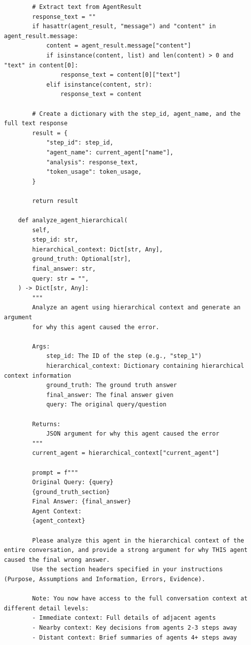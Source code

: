 \documentclass{article}
\begin{document}
\begin{lstlisting}
        # Extract text from AgentResult
        response_text = ""
        if hasattr(agent_result, "message") and "content" in agent_result.message:
            content = agent_result.message["content"]
            if isinstance(content, list) and len(content) > 0 and "text" in content[0]:
                response_text = content[0]["text"]
            elif isinstance(content, str):
                response_text = content

        # Create a dictionary with the step_id, agent_name, and the full text response
        result = {
            "step_id": step_id,
            "agent_name": current_agent["name"],
            "analysis": response_text,
            "token_usage": token_usage,
        }

        return result

    def analyze_agent_hierarchical(
        self,
        step_id: str,
        hierarchical_context: Dict[str, Any],
        ground_truth: Optional[str],
        final_answer: str,
        query: str = "",
    ) -> Dict[str, Any]:
        """
        Analyze an agent using hierarchical context and generate an argument
        for why this agent caused the error.

        Args:
            step_id: The ID of the step (e.g., "step_1")
            hierarchical_context: Dictionary containing hierarchical context information
            ground_truth: The ground truth answer
            final_answer: The final answer given
            query: The original query/question

        Returns:
            JSON argument for why this agent caused the error
        """
        current_agent = hierarchical_context["current_agent"]

        prompt = f"""
        Original Query: {query}
        {ground_truth_section}
        Final Answer: {final_answer}
        Agent Context:
        {agent_context}
        
        Please analyze this agent in the hierarchical context of the entire conversation, and provide a strong argument for why THIS agent caused the final wrong answer.
        Use the section headers specified in your instructions (Purpose, Assumptions and Information, Errors, Evidence).
        
        Note: You now have access to the full conversation context at different detail levels:
        - Immediate context: Full details of adjacent agents
        - Nearby context: Key decisions from agents 2-3 steps away
        - Distant context: Brief summaries of agents 4+ steps away
        

\end{lstlisting}
\end{document}
